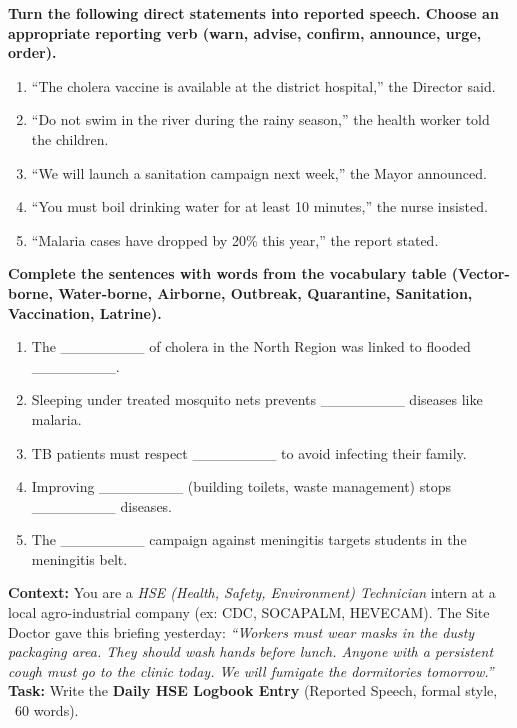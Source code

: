 \documentclass[11pt]{article}
\begin{document}
\begin{exercice}
\textbf{Turn the following direct statements into reported speech. Choose an appropriate reporting verb (warn, advise, confirm, announce, urge, order).}
\begin{enumerate}
    \item ``The cholera vaccine is available at the district hospital,'' the Director said.
    \item ``Do not swim in the river during the rainy season,'' the health worker told the children.
    \item ``We will launch a sanitation campaign next week,'' the Mayor announced.
    \item ``You must boil drinking water for at least 10 minutes,'' the nurse insisted.
    \item ``Malaria cases have dropped by 20\% this year,'' the report stated.
\end{enumerate}
\end{exercice}

\begin{exercice}
\textbf{Complete the sentences with words from the vocabulary table (Vector-borne, Water-borne, Airborne, Outbreak, Quarantine, Sanitation, Vaccination, Latrine).}
\begin{enumerate}
    \item The \_\_\_\_\_\_\_\_ of cholera in the North Region was linked to flooded \_\_\_\_\_\_\_\_.
    \item Sleeping under treated mosquito nets prevents \_\_\_\_\_\_\_\_ diseases like malaria.
    \item TB patients must respect \_\_\_\_\_\_\_\_ to avoid infecting their family.
    \item Improving \_\_\_\_\_\_\_\_ (building toilets, waste management) stops \_\_\_\_\_\_\_\_ diseases.
    \item The \_\_\_\_\_\_\_\_ campaign against meningitis targets students in the meningitis belt.
\end{enumerate}
\end{exercice}

\begin{exercice}
\textbf{Context:} You are a \emph{HSE (Health, Safety, Environment) Technician} intern at a local agro-industrial company (ex: CDC, SOCAPALM, HEVECAM). The Site Doctor gave this briefing yesterday:
\emph{``Workers must wear masks in the dusty packaging area. They should wash hands before lunch. Anyone with a persistent cough must go to the clinic today. We will fumigate the dormitories tomorrow.''}
\textbf{Task:} Write the \textbf{Daily HSE Logbook Entry} (Reported Speech, formal style, ~60 words).
\end{exercice}
\end{document}
